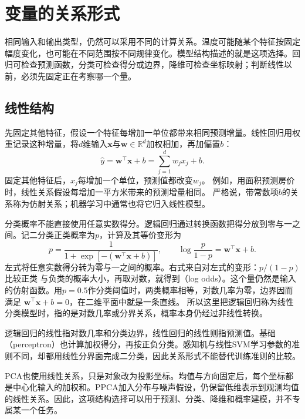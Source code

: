 \section{变量的关系形式}
\label{sec:models-structure}

相同输入和输出类型，仍然可以采用不同的计算关系。温度可能随某个特征按固定幅度变化，也可能在不同范围按不同规律变化。模型结构描述的就是这项选择。回归可检查预测函数，分类可检查得分或边界，降维可检查坐标映射；判断线性以前，必须先固定正在考察哪一个量。

\subsection{线性结构}
\label{sec:models-linear}

先固定其他特征，假设一个特征每增加一单位都带来相同预测增量。线性回归用权重记录这种增量，将$d$维输入$\bm{x}$与$\bm{w}\in\mathbb{R}^{d}$加权相加，再加偏置$b$：
\begin{equation}
  \hat{y}=\bm{w}^{\top}\bm{x}+b
  =\sum_{j=1}^{d}w_jx_j+b.
  \label{eq:models-linear-score}
\end{equation}
固定其他特征后，$x_j$每增加一个单位，预测值都改变$w_j$。
例如，用面积预测房价时，线性关系假设每增加一平方米带来的预测增量相同。
严格说，带常数项$b$的关系称为仿射关系；机器学习中通常也将它归入线性模型。

分类概率不能直接使用任意实数得分。逻辑回归通过转换函数把得分放到零与一之间。记二分类正类概率为$p$，计算及其等价变形为
\begin{equation}
  p=\frac{1}{1+\exp[-(\bm{w}^{\top}\bm{x}+b)]},
  \qquad
  \log\frac{p}{1-p}=\bm{w}^{\top}\bm{x}+b.
  \label{eq:models-logistic-structure}
\end{equation}
左式将任意实数得分转为零与一之间的概率。右式来自对左式的变形：$p/(1-p)$比较正类
与负类的概率大小，再取对数，就得到（log odds）。这个量仍然是输入
的仿射函数。用$p=0.5$作分类阈值时，两类概率相等，对数几率为零，边界因而满足
$\bm{w}^{\top}\bm{x}+b=0$，在二维平面中就是一条直线。
所以这里把逻辑回归称为线性分类模型时，指的是对数几率或分界关系，概率本身仍经过非线性转换。

逻辑回归的线性指对数几率和分类边界，线性回归的线性则指预测值。基础（perceptron）也计算加权得分，再按正负分类。感知机与线性SVM学习参数的准则不同，却都用线性分界面完成二分类，因此关系形式不能替代训练准则的比较。

PCA也使用线性关系，只是对象改为投影坐标。均值与方向固定后，每个坐标都是中心化输入的加权和。PPCA加入分布与噪声假设，仍保留低维表示到观测均值的线性关系。因此，这项结构选择可以用于预测、分类、降维和概率建模，并不专属某一个任务。

